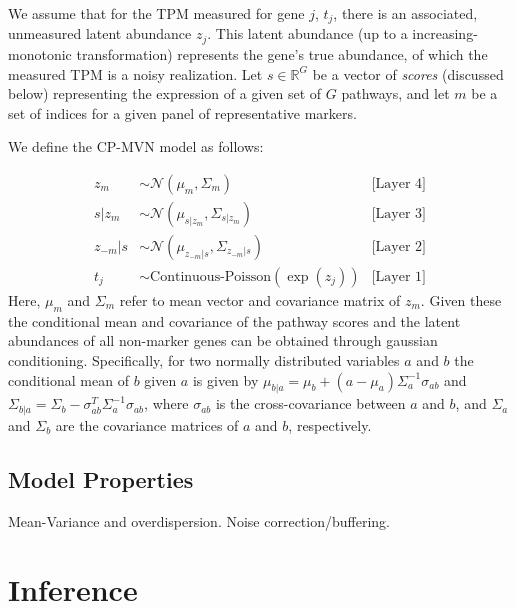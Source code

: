 \documentclass[10pt]{article}
\begin{document}
We assume that for the TPM measured for gene $j$, $t_j$, there is an associated, unmeasured latent abundance $z_j$. This latent abundance (up to a increasing-monotonic transformation) represents the gene's true abundance, of which the measured TPM is a noisy realization. Let $s \in \mathbb{R}^{G}$ be a vector of \emph{scores} (discussed below) representing the expression of a given set of $G$ pathways, and let $m$ be a set of indices for a given panel of representative markers.

We define the CP-MVN model as follows:

\begin{align*}
z_m & \sim \mathcal{N}(\mu_m, \Sigma_m)  & \textrm{[Layer 4]} \\
s|z_m & \sim \mathcal{N}(\mu_{s|z_m}, \Sigma_{s|z_m})  & \textrm{[Layer 3]}\\
z_{-m}|s & \sim \mathcal{N}(\mu_{z_{-m}|s}, \Sigma_{z_{-m}|s}) & \textrm{[Layer 2]}\\
t_j & \sim \textrm{Continuous-Poisson}(\exp(z_j)) & \textrm{[Layer 1]}
\end{align*}
Here, $\mu_m$ and $\Sigma_m$ refer to mean vector and covariance matrix of $z_m$. Given these the conditional mean and covariance of the pathway scores and the latent abundances of all non-marker genes can be obtained through gaussian conditioning. Specifically, for two normally distributed variables $a$ and $b$ the conditional mean of $b$ given $a$ is given by $\mu_{b|a} = \mu_b + (a - \mu_a)\Sigma_{a}^{-1}\sigma_{ab}$ and $\Sigma_{b|a} = \Sigma_{b} - \sigma_{ab}^T\Sigma_a^{-1}\sigma_{ab}$, where $\sigma_{ab}$ is the cross-covariance between $a$ and $b$, and $\Sigma_a$ and $\Sigma_b$ are the covariance matrices of $a$ and $b$, respectively.

\subsection{Model Properties}
Mean-Variance and overdispersion. Noise correction/buffering.

\section{Inference} \label{inference}
\end{document}
